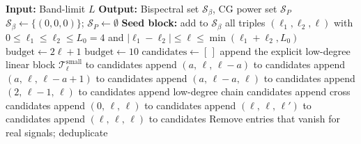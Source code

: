 \documentclass{article}
\theoremstyle{definition}
\theoremstyle{remark}
\newcommand{\SO}{\mathrm{SO}}
\theoremstyle{definition}
\begin{document}
\begin{algorithm}[t]
\caption{Augmented selective index set for the $\SO(3)$ bispectrum
  on $S^2$ at band-limit~$L$. Returns bispectral triples
  $\mathcal{S}_\beta$ and CG power triples $\mathcal{S}_P$.
  This extends the BFS-based selective index construction of
  \citet{mataigne2024selective} from finite groups to $\SO(3)$ on $S^2$,
  adding the CG power augmentation step that is specific to real
  signals.}
\label{alg:so3-augmented}
\small
\begin{algorithmic}[1]
\STATE \textbf{Input:} Band-limit $L$
\STATE \textbf{Output:} Bispectral set $\mathcal{S}_\beta$, CG power
  set $\mathcal{S}_P$
\STATE $\mathcal{S}_\beta \leftarrow \{(0,0,0)\}$;
  $\mathcal{S}_P \leftarrow \emptyset$
\STATE \textbf{Seed block:} add to $\mathcal{S}_\beta$ all triples
  $(\ell_1, \ell_2, \ell)$ with $0 \le \ell_1 \le \ell_2 \le L_0 = 4$
  and $|\ell_1 - \ell_2| \le \ell \le \min(\ell_1 + \ell_2, L_0)$
  \STATE $\text{budget} \leftarrow 2\ell + 1$
    \STATE $\text{budget} \leftarrow 10$
  \ENDIF
  \STATE $\text{candidates} \leftarrow [\,]$
    \STATE append the explicit low-degree linear block
      $\mathcal{T}^{\mathrm{small}}_\ell$ to candidates
      \STATE append $(a,\, \ell,\, \ell{-}a)$ to candidates
    \ENDFOR
        \STATE append $(a,\, \ell,\, \ell{-}a{+}1)$ to candidates
      \ENDIF
    \ENDFOR
      \STATE append $(a,\, \ell{-}a,\, \ell)$ to candidates
    \ENDFOR
      \STATE append $(2,\, \ell{-}1,\, \ell)$ to candidates
    \ENDIF
  \ELSE
    \STATE append low-degree chain candidates
      \STATE append cross candidates
    \ENDIF
  \ENDIF
  \STATE append $(0,\, \ell,\, \ell)$ to candidates
      \STATE append $(\ell,\, \ell,\, \ell')$ to candidates
    \ENDFOR
  \ENDIF
    \STATE append $(\ell,\, \ell,\, \ell)$ to candidates
  \ENDIF
  \STATE Remove entries that vanish for real signals; deduplicate

\end{algorithmic}
\end{algorithm}
\end{document}
